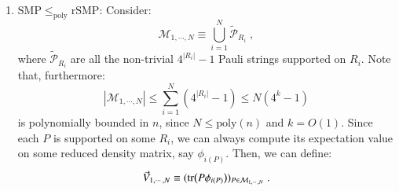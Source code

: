 \documentclass[10pt,aps,pra,twocolumn,floatfix,nofootinbib,superscriptaddress,longbibliography]{revtex4-2}
\newcommand{\1}{\mathbbm{1}}
\begin{document}
\begin{enumerate}
\begin{itemize}
\begin{equation}
        \end{equation}
        We claim that $\vec p= (p(\mathbf x ) )_{\mathbf x \in \mathbb F_2^n}$ is our desired global probability distribution. From the commutativity of the dephasing channel with partial traces $\mathcal D[\tr_X(\cdot)] =\tr_X\mathcal D(\cdot)$, we have:
        \begin{equation}
            \mathcal D(\phi_i) = \tr_{\bar R_i}\mathcal D(\phi)\;,\;\forall i \in [N] \Leftrightarrow \sum_{\mathbf x\in \mathbb F_2^{|R_i|}} p_i(\mathbf x) \ket{\mathbf x}\bra{\mathbf x}=\sum_{\mathbf x \in \mathbb F_2^{|R_i|}} \left( \sum_{\bar{\mathbf x} \in \mathbb F_2^{n-|R_i|}}p(\mathbf x, \bar{\mathbf x})\right)\ket{\mathbf x }\bra{\mathbf x}\;,\;\forall i \in [N]\;,
        \end{equation}
        which is only true if $\vec{p}$ indeed is a YES instance of the CMP.
    \end{itemize}
    Hence, we have shown that under poly-time preprocessing, the decision of Def.~\ref{def:classmargprob} reduces to Def.~\ref{def:stabmargprob}.
    \item $\mathrm{SMP} \leq_\mathrm{poly} \mathrm{rSMP}$: Consider:
\begin{equation}
    \mathcal M_{1,\cdots, N} \equiv \bigcup_{i=1}^N \tilde{ \mathcal P}_{R_i}\;,
    \label{eq:tomographicdecomp}
\end{equation}
where $\tilde{\mathcal P}_{R_i}$ are all the non-trivial $4^{|R_i|}-1$ Pauli strings supported on $R_i$. Note that, furthermore:
\begin{equation}
    |\mathcal M_{1,\cdots,N}| \leq\sum_{i =1}^N(4^{|R_i|}-1) \leq N (4^k-1)
\end{equation}
is polynomially bounded in $n$, since $N \leq \mathrm{poly}(n)$ and $k=O(1)$. Since each $P$ is supported on some $R_i$, we can always compute its expectation value on some reduced density matrix, say $\phi_{i(P)}$. Then, we can define:
\begin{equation}
    \vec V_{1,\cdots, N} \equiv (\tr(P\phi_{i(P)}))_{P \in \mathcal M_{1, \cdots, N}}\;.
\end{equation}



\end{enumerate}
\end{document}
